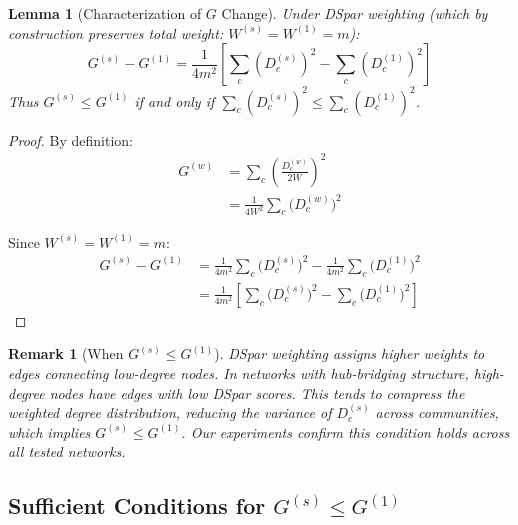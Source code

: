 \documentclass[10pt,journal,compsoc]{IEEEtran}
\newtheorem{lemma}{Lemma}
\newtheorem{remark}{Remark}
\begin{document}
\begin{lemma}[Characterization of $G$ Change]
\label{lem:G_change}
Under DSpar weighting (which by construction preserves total weight: $W^{(s)} = W^{(1)} = m$):
\begin{equation}
G^{(s)} - G^{(1)} = \frac{1}{4m^2} \left[ \sum_c (D_c^{(s)})^2 - \sum_c (D_c^{(1)})^2 \right]
\end{equation}
Thus $G^{(s)} \leq G^{(1)}$ if and only if $\sum_c (D_c^{(s)})^2 \leq \sum_c (D_c^{(1)})^2$.
\end{lemma}

\begin{proof}
By definition:
\begin{equation}
\begin{aligned}
G^{(w)}
&= \sum_c \left(\frac{D_c^{(w)}}{2W}\right)^2 \\
&= \frac{1}{4W^2} \sum_c \bigl(D_c^{(w)}\bigr)^2
\end{aligned}
\end{equation}

Since $W^{(s)} = W^{(1)} = m$:
\begin{equation}
\begin{aligned}
G^{(s)} - G^{(1)}
&= \frac{1}{4m^2} \sum_c \bigl(D_c^{(s)}\bigr)^2
 - \frac{1}{4m^2} \sum_c \bigl(D_c^{(1)}\bigr)^2 \\
&= \frac{1}{4m^2}
\left[
\sum_c \bigl(D_c^{(s)}\bigr)^2
- \sum_c \bigl(D_c^{(1)}\bigr)^2
\right]
\end{aligned}
\end{equation}
\end{proof}


\begin{remark}[When $G^{(s)} \leq G^{(1)}$]
DSpar weighting assigns higher weights to edges connecting low-degree nodes. In networks with hub-bridging structure, high-degree nodes have edges with low DSpar scores. This tends to compress the weighted degree distribution, reducing the variance of $D_c^{(s)}$ across communities, which implies $G^{(s)} \leq G^{(1)}$. Our experiments confirm this condition holds across all tested networks.
\end{remark}

\subsection{\texorpdfstring{Sufficient Conditions for $G^{(s)} \leq G^{(1)}$}{Sufficient Conditions for G(s) <= G(1)}}
\end{document}
